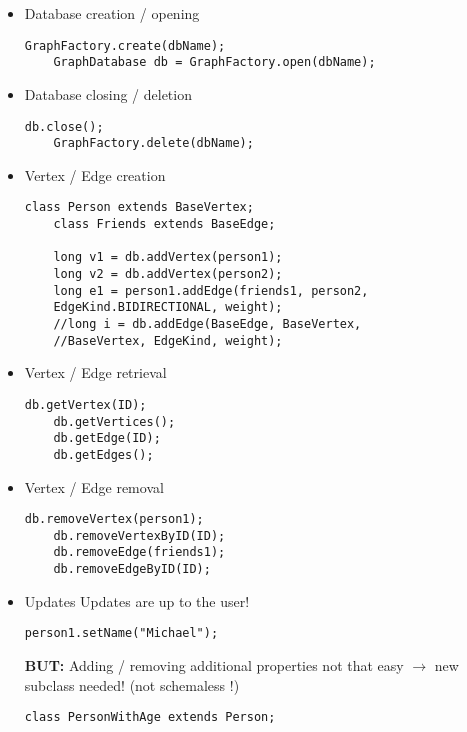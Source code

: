 \begin{itemize}

	\item Database creation / opening	
	\begin{lstlisting}[caption=(Creating / opening a DB)]
	GraphFactory.create(dbName);
	GraphDatabase db = GraphFactory.open(dbName);
	\end{lstlisting}

	\item Database closing / deletion
	\begin{lstlisting}[caption=(Closing / deleting a DB)]
	db.close();
	GraphFactory.delete(dbName);
	\end{lstlisting}

	\item Vertex / Edge creation
	\begin{lstlisting}[caption=(Vertex / Edge creation)]
	class Person extends BaseVertex;
	class Friends extends BaseEdge;

	long v1 = db.addVertex(person1);
	long v2 = db.addVertex(person2);
	long e1 = person1.addEdge(friends1, person2, 
	EdgeKind.BIDIRECTIONAL, weight);
	//long i = db.addEdge(BaseEdge, BaseVertex, 
	//BaseVertex, EdgeKind, weight);
	\end{lstlisting}

	\item Vertex / Edge retrieval
	\begin{lstlisting}[caption=(Vertex / Edge retrieval)]
	db.getVertex(ID);
	db.getVertices();
	db.getEdge(ID);
	db.getEdges();
	\end{lstlisting}

	\item Vertex / Edge removal
	\begin{lstlisting}[caption=(Vertex / Edge removal)]
	db.removeVertex(person1);
	db.removeVertexByID(ID);
	db.removeEdge(friends1);
	db.removeEdgeByID(ID);
	\end{lstlisting}

	\item Updates
	Updates are up to the user!

	\begin{lstlisting}[caption=(User defined update method)]
	person1.setName("Michael");
	\end{lstlisting}

	\textbf{BUT:} Adding / removing additional properties not that easy 	$\rightarrow$ new subclass needed! (not schemaless !)
	\begin{lstlisting}[caption=(Subclass of Person with additional "age" property)]	
	class PersonWithAge extends Person;


\end{lstlisting}
\end{itemize}
